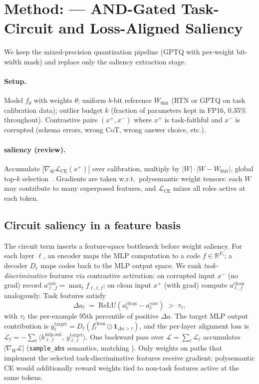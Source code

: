 \section{Method: \family{} --- AND-Gated Task-Circuit and Loss-Aligned Saliency}
\label{sec:method}

We keep the \baseline{} mixed-precision quantization pipeline (GPTQ with
per-weight bit-width mask) and replace only the saliency extraction stage.

\paragraph{Setup.}
Model $f_\theta$ with weights $\theta$; uniform $b$-bit reference
$W_{b\text{bit}}$ (RTN or GPTQ on task calibration data); outlier budget $k$
(fraction of parameters kept in FP16, 0.35\% throughout). Contrastive pairs
$(x^+, x^-)$ where $x^+$ is task-faithful and $x^-$ is corrupted (schema
errors, wrong CoT, wrong answer choice, etc.).

\paragraph{\baseline{} saliency (review).}
Accumulate $|\nabla_W \mathcal{L}_{\text{CE}}(x^+)|$ over calibration, multiply
by $|W| \cdot |W - W_{b\text{bit}}|$, global top-$k$
selection~\citep{xiao2025tacq}. Gradients are taken w.r.t.\ polysemantic
weight tensors: each $W$ may contribute to many superposed features, and
$\mathcal{L}_{\text{CE}}$ mixes all roles active at each token.

\subsection{Circuit saliency in a feature basis}
\label{sec:method-circuit}

The circuit term inserts a feature-space bottleneck before weight saliency.
For each layer $\ell$, an encoder maps the MLP computation to a code
$f \in \mathbb{R}^{F_\ell}$; a decoder $D_\ell$ maps codes back to the MLP
output space. We rank \emph{task-discriminative} features via contrastive
activation: on corrupted input $x^-$ (no grad) record
$a^{\text{corr}}_{\ell,f} = \max_t f_{\ell,t,f}$; on clean input $x^+$ (with
grad) compute $a^{\text{clean}}_{\ell,f}$ analogously. Task features satisfy
\begin{equation}
\Delta a_\ell \;=\; \mathrm{ReLU}\!\left(a^{\text{clean}}_\ell - a^{\text{corr}}_\ell\right) \;>\; \tau_\ell,
\end{equation}
with $\tau_\ell$ the per-example 95th percentile of positive $\Delta a$. The
target MLP output contribution is
$y^{\text{target}}_\ell = D_\ell\!\left(f^{\text{clean}}_\ell \odot \mathbf{1}_{\Delta a > \tau}\right)$,
and the per-layer alignment loss is
$\mathcal{L}_\ell = -\sum_t \langle h^{\text{mlp,out}}_{\ell,t},\, y^{\text{target}}_{\ell,t} \rangle$.
One backward pass over $\mathcal{L} = \sum_\ell \mathcal{L}_\ell$ accumulates
$|\nabla_W \mathcal{L}|$ (\texttt{sample\_abs} semantics, matching
\baseline{}). Only weights on paths that implement the selected
task-discriminative features receive gradient; polysemantic CE would
additionally reward weights tied to non-task features active at the same
tokens.

